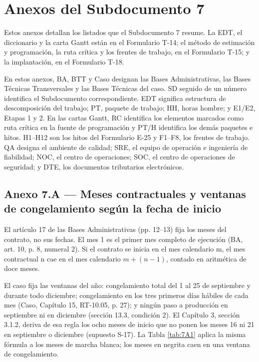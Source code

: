 \chapter{Anexos del Subdocumento 7}

Estos anexos detallan los listados que el Subdocumento 7 resume. La EDT, el diccionario y la carta Gantt están en el Formulario T-14; el método de estimación y programación, la ruta crítica y los frentes de trabajo, en el Formulario T-15; y la implantación, en el Formulario T-18.

En estos anexos, BA, BTT y Caso designan las Bases Administrativas, las Bases Técnicas Transversales y las Bases Técnicas del caso. SD seguido de un número identifica el Subdocumento correspondiente. EDT significa estructura de descomposición del trabajo; PT, paquete de trabajo; HH, horas hombre; y E1/E2, Etapas 1 y 2. En las cartas Gantt, RC identifica los elementos marcados como ruta crítica en la fuente de programación y PT/H identifica los demás paquetes e hitos. H1–H12 son los hitos del Formulario E-25 y F1–F8, los frentes de trabajo. QA designa el ambiente de calidad; SRE, el equipo de operación e ingeniería de fiabilidad; NOC, el centro de operaciones; SOC, el centro de operaciones de seguridad; y DTE, los documentos tributarios electrónicos.

\section{Anexo 7.A — Meses contractuales y ventanas de congelamiento según la fecha de inicio}

El artículo 17 de las Bases Administrativas (pp. 12--13) fija los meses del contrato, no sus fechas. El mes 1 es el primer mes completo de ejecución (BA, art. 10, p. 8, numeral 2). Si el contrato se inicia en el mes calendario m, el mes contractual n cae en el mes calendario \(m + (n - 1)\), contado en aritmética de doce meses.

El caso fija las ventanas del año: congelamiento total del 1 al 25 de septiembre y durante todo diciembre; congelamiento en los tres primeros días hábiles de cada mes (Caso, Capítulo 15, RT-10.05, p. 27); y ningún paso a producción en septiembre ni en diciembre (sección 13.3, condición 2). El Capítulo 3, sección 3.1.2, deriva de esa regla los ocho meses de inicio que no ponen los meses 16 ni 21 en septiembre o diciembre (supuesto S-17). La Tabla \ref{tab:7A1} aplica la misma fórmula a los meses de marcha blanca; los meses en negrita caen en una ventana de congelamiento.

